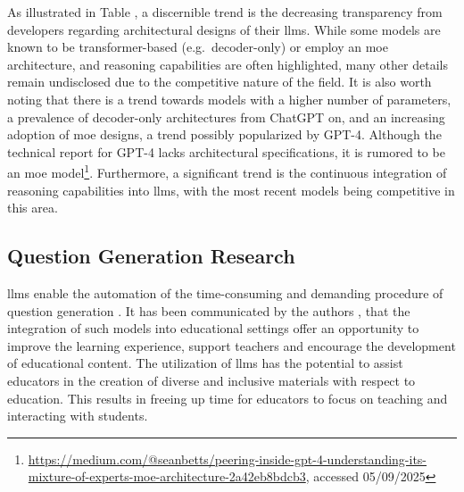  As illustrated in Table , a discernible trend is the decreasing transparency from developers regarding architectural designs of their \ac{llms}. While some models are known to be transformer-based (e.g.\ decoder-only) or employ an \ac{moe} architecture, and reasoning capabilities are often highlighted, many other details remain undisclosed due to the competitive nature of the field. It is also worth noting that there is a trend towards models with a higher number of parameters, a prevalence of decoder-only architectures from ChatGPT on, and an increasing adoption of \ac{moe} designs, a trend possibly popularized by GPT-4. Although the technical report for GPT-4 \cite{openai_gpt-4_2024} lacks architectural specifications, it is rumored to be an \ac{moe} model\footnote{\url{https://medium.com/@seanbetts/peering-inside-gpt-4-understanding-its-mixture-of-experts-moe-architecture-2a42eb8bdcb3}, accessed 05/09/2025}. Furthermore, a significant trend is the continuous integration of reasoning capabilities into \ac{llms}, with the most recent models being competitive in this area.

\subsection{Question Generation Research}
\label{sec:question-generation-research}

\ac{llms} enable the automation of the time-consuming and demanding procedure of question generation \cite{vu_chatgpt-based_2024}. It has been communicated by the authors \cite{naveed_comprehensive_2024}, that the integration of such models into educational settings offer an opportunity to improve the learning experience, support teachers and encourage the development of educational content. The utilization of \ac{llms} has the potential to assist educators in the creation of diverse and inclusive materials with respect to education. This results in freeing up time for educators to focus on teaching and interacting with students.


